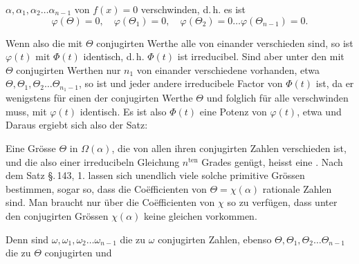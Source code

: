 $\alpha, \alpha_1, \alpha_2 \ldots \alpha_{n-1}$ von $f(x) = 0$ verschwinden, d.\,h. es ist
\[
\varphi(\Theta) = 0,\quad \varphi(\Theta_1) = 0,\quad \varphi(\Theta_2) = 0 \ldots \varphi(\Theta_{n-1}) = 0.
\]

Wenn also die mit $\Theta$ conjugirten Werthe alle von einander
verschieden sind, so ist $\varphi(t)$ mit $\Phi(t)$ identisch, d.\,h.
$\Phi(t)$ ist irreducibel. Sind aber unter den mit $\Theta$
conjugirten Werthen nur $n_1$ von einander verschiedene vorhanden,
etwa $\Theta, \Theta_1, \Theta_2 \ldots \Theta_{n_1-1}$, so ist
und jeder andere irreducibele Factor von $\Phi(t)$ ist, da er
wenigstens für einen der conjugirten Werthe $\Theta$ und folglich
für alle verschwinden muss, mit $\varphi(t)$ identisch. Es ist also
$\Phi(t)$ eine Potenz von $\varphi(t)$, etwa
und
Daraus ergiebt sich also der Satz:


Eine Grösse $\Theta$ in $\Omega(\alpha)$, die von allen ihren
conjugirten Zahlen verschieden ist, und die also einer
irreducibeln Gleichung $n^{\mathrm{ten}}$ Grades genügt, heisst eine
. Nach dem Satz \S.\,143, 1. lassen sich
unendlich viele solche primitive Grössen bestimmen, sogar so, dass
die Co\"efficienten von $\Theta = \chi(\alpha)$ rationale Zahlen sind.
Man braucht nur über die Co\"efficienten von $\chi$ so zu verfügen,
dass unter den conjugirten Grössen $\chi(\alpha)$ keine gleichen
vorkommen.


Denn sind $\omega, \omega_1, \omega_2 \ldots \omega_{n-1}$ die zu
$\omega$ conjugirten Zahlen, ebenso $\Theta, \Theta_1, \Theta_2
\ldots \Theta_{n-1}$ die zu $\Theta$ conjugirten und
